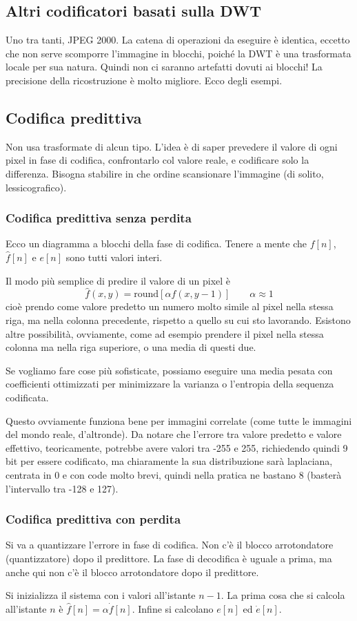 \documentclass[a4paper,11pt]{article}
\begin{document}
\subsection{Altri codificatori basati sulla DWT}
Uno tra tanti, JPEG 2000. La catena di operazioni da eseguire è identica, eccetto che non serve scomporre l'immagine in blocchi, poiché la DWT è una trasformata locale per sua natura.
Quindi non ci saranno artefatti dovuti ai blocchi! La precisione della ricostruzione è molto migliore. Ecco degli esempi.

\subsection{Codifica predittiva}
Non usa trasformate di alcun tipo. L'idea è di saper prevedere il valore di ogni pixel in fase di codifica, confrontarlo col valore reale, e codificare solo la differenza.
Bisogna stabilire in che ordine scansionare l'immagine (di solito, lessicografico).

\subsubsection{Codifica predittiva senza perdita}
Ecco un diagramma a blocchi della fase di codifica. Tenere a mente che $f[n]$, $\hat{f}[n]$ e $e[n]$ sono tutti valori interi.
\par
Il modo più semplice di predire il valore di un pixel è
\[
\hat{f}(x,y) = \text{round}[\alpha f(x,y-1)] \qquad \alpha \approx 1
\]
cioè prendo come valore predetto un numero molto simile al pixel nella stessa riga, ma nella colonna precedente, rispetto a quello su cui sto lavorando. Esistono altre possibilità, ovviamente,
come ad esempio prendere il pixel nella stessa colonna ma nella riga superiore, o una media di questi due.
\par
Se vogliamo fare cose più sofisticate, possiamo eseguire una media pesata con coefficienti ottimizzati per minimizzare la varianza o l'entropia della sequenza codificata.
\par
Questo ovviamente funziona bene per immagini correlate (come tutte le immagini del mondo reale, d'altronde). Da notare che l'errore tra valore predetto e valore effettivo, teoricamente,
potrebbe avere valori tra -255 e 255, richiedendo quindi 9 bit per essere codificato, ma chiaramente la sua distribuzione sarà laplaciana, centrata in 0 e con code molto brevi, quindi nella
pratica ne bastano 8 (basterà l'intervallo tra -128 e 127).

\subsubsection{Codifica predittiva con perdita}
Si va a quantizzare l'errore in fase di codifica. Non c'è il blocco arrotondatore (quantizzatore) dopo il predittore. La fase di decodifica è uguale a prima, ma anche qui non c'è il blocco arrotondatore dopo il predittore.
\par
Si inizializza il sistema con i valori all'istante $n-1$. La prima cosa che si calcola all'istante $n$  è $\hat{f}[n] = \alpha \dot{f}[n]$. Infine si calcolano $e[n]$ ed $\dot{e}[n]$.
\end{document}
